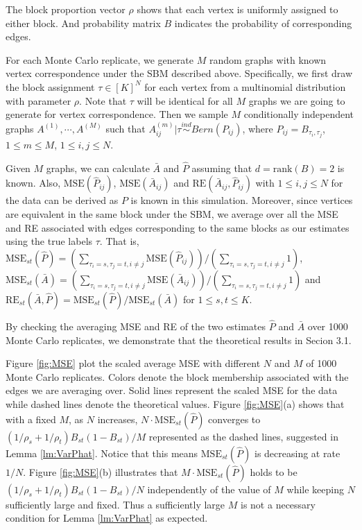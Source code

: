 The block proportion vector $\rho$ shows that each vertex is uniformly assigned to either block. And probability matrix $B$ indicates the probability of corresponding edges.

For each Monte Carlo replicate, we generate $M$ random graphs with known vertex correspondence under the SBM described above. Specifically, we first draw the block assignment $\tau \in [K]^N$ for each vertex from a multinomial distribution with parameter $\rho$. Note that $\tau$ will be identical for all $M$ graphs we are going to generate for vertex correspondence. Then we sample $M$ conditionally independent graphs $A^{(1)}, \cdots, A^{(M)}$ such that $A^{(m)}_{ij}|\tau \stackrel{ind}{\sim} Bern(P_{ij})$, where $P_{ij} = B_{\tau_i, \tau_j}$, $1 \le m \le M$, $1 \le i, j \le N$.

Given $M$ graphs, we can calculate $\bar{A}$ and $\hat{P}$ assuming that $d = \mathrm{rank}(B) = 2$ is known. Also, $\mathrm{MSE}(\hat{P}_{ij})$, $\mathrm{MSE}(\bar{A}_{ij})$ and $\mathrm{RE}(\bar{A}_{ij}, \hat{P}_{ij})$ with $1 \le i, j \le N$ for the data can be derived as $P$ is known in this simulation. Moreover, since vertices are equivalent in the same block under the SBM, we average over all the MSE and RE associated with edges corresponding to the same blocks as our estimates using the true labels $\tau$. That is, $\mathrm{MSE}_{st}(\hat{P}) = (\sum_{\tau_i = s, \tau_j = t, i\ne j} \mathrm{MSE}(\hat{P}_{ij}))/(\sum_{\tau_i = s, \tau_j = t, i\ne j}1)$, $\mathrm{MSE}_{st}(\bar{A}) = (\sum_{\tau_i = s, \tau_j = t, i\ne j} \mathrm{MSE}(\bar{A}_{ij}))/(\sum_{\tau_i = s, \tau_j = t, i\ne j}1)$ and $\mathrm{RE}_{st}(\bar{A}, \hat{P}) = \mathrm{MSE}_{st}(\hat{P})/\mathrm{MSE}_{st}(\bar{A})$ for $1 \le s, t \le K$.

By checking the averaging MSE and RE of the two estimates $\hat{P}$ and $\bar{A}$ over 1000 Monte Carlo replicates, we demonstrate that the theoretical results in Secion 3.1.

Figure \ref{fig:MSE} plot the scaled average MSE with different $N$ and $M$ of 1000 Monte Carlo replicates. Colors denote the block membership associated with the edges we are averaging over. Solid lines represent the scaled MSE for the data while dashed lines denote the theoretical values.
Figure \ref{fig:MSE}(a) shows that with a fixed $M$, as $N$ increases, $N \cdot \mathrm{MSE}_{st}(\hat{P})$ converges to $(1/\rho_s + 1/\rho_t) B_{st}(1-B_{st}) / M$ represented as the dashed lines, suggested in Lemma \ref{lm:VarPhat}. Notice that this means $\mathrm{MSE}_{st}(\hat{P})$ is decreasing at rate $1/N$.
Figure \ref{fig:MSE}(b) illustrates that $M \cdot \mathrm{MSE}_{st}(\hat{P})$ holds to be $(1/\rho_s + 1/\rho_t) B_{st}(1-B_{st}) / N$ independently of the value of $M$ while keeping $N$ sufficiently large and fixed. Thus a sufficiently large $M$ is not a necessary condition for Lemma \ref{lm:VarPhat} as expected.


